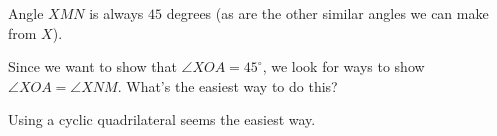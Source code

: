 



Angle $XMN$ is always $45$ degrees (as are the other similar angles we can make from $X$).


Since we want to show that $\angle XOA = 45^\circ$, we look for ways to show $\angle XOA = \angle XNM$. What's the easiest way to do this?





Using a cyclic quadrilateral seems the easiest way.







